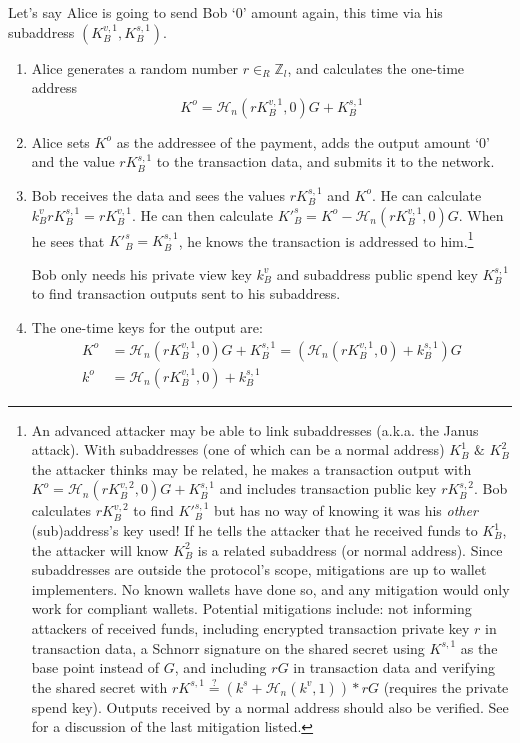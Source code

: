 Let's say Alice is going to send Bob `0' amount again, this time via his subaddress $(K_B^{v,1}, K_B^{s,1})$.
\begin{enumerate}
	\item Alice generates a random number $r \in_R \mathbb{Z}_l$, and calculates the one-time address\vspace{.175cm}
	\[ K^o  = \mathcal{H}_n(r K_B^{v,1},0)G + K_B^{s,1} \]

	\item Alice sets $K^o$ as the addressee of the payment, adds the output amount `0' and the value $r K_B^{s,1}$ to the transaction data, and submits it to the network.
	
	\item Bob receives the data and sees the values $r K_B^{s,1}$ and $K^o$. He can calculate $k_B^v r K_B^{s,1} = r K_B^{v,1}$. He can then calculate $K'^{s}_B = K^o - \mathcal{H}_n(r K_B^{v,1},0)G$. When he sees that $K'^{s}_B = K^{s,1}_B$, he knows the transaction is addressed to him.\footnote{An advanced attacker may be able to link subaddresses \cite{janus-attack} (a.k.a. the Janus attack). With subaddresses (one of which can be a normal address) $K_B^1$ $\&$ $K_B^2$ the attacker thinks may be related, he makes a transaction output with $K^o = \mathcal{H}_n(r K_B^{v,2},0)G + K_B^{s,1}$ and includes transaction public key $r K_B^{s,2}$. Bob calculates $r K_B^{v,2}$ to find $K'^{s,1}_B$ but has no way of knowing it was his {\em other} (sub)address's key used! If he tells the attacker that he received funds to $K_B^1$, the attacker will know $K_B^2$ is a related subaddress (or normal address). Since subaddresses are outside the protocol's scope, mitigations are up to wallet implementers. No known wallets have done so, and any mitigation would only work for compliant wallets. Potential mitigations include: not informing attackers of received funds, including encrypted transaction private key $r$ in transaction data, a Schnorr signature on the shared secret using $K^{s,1}$ as the base point instead of $G$, and including $rG$ in transaction data and verifying the shared secret with $rK^{s,1} \stackrel{?}{=} (k^s + \mathcal{H}_n(k^v, 1))*rG$ (requires the private spend key). Outputs received by a normal address should also be verified. See \cite{janus-mitigation-issue-62} for a discussion of the last mitigation listed.}
	
	Bob only needs his private view key $k_B^v$ and subaddress public spend key $K^{s,1}_B$ to find transaction outputs sent to his subaddress.
	
	\item The one-time keys for the output are:\vspace{.175cm}
	\begin{align*}
		K^o &= \mathcal{H}_n(r K_B^{v,1},0)G + K_B^{s,1} = (\mathcal{H}_n(r K_B^{v,1},0) + k_B^{s,1})G  \\ 
		k^o &= \mathcal{H}_n(r K_B^{v,1},0) + k_B^{s,1}
	\end{align*}
\end{enumerate}

